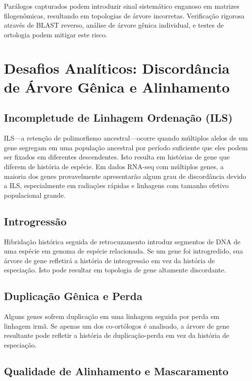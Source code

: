Parálogos capturados podem introduzir sinal sistemático enganoso em matrizes filogenômicas, resultando em topologias de árvore incorretas. Verificação rigorosa através de BLAST reverso, análise de árvore gênica individual, e testes de ortologia podem mitigar este risco.

\section{Desafios Analíticos: Discordância de Árvore Gênica e Alinhamento}

\subsection{Incompletude de Linhagem Ordenação (ILS)}

ILS---a retenção de polimorfismo ancestral---ocorre quando múltiplos alelos de um gene segregam em uma população ancestral por período suficiente que eles podem ser fixados em diferentes descendentes. Isto resulta em histórias de gene que diferem de história de espécie. Em dados RNA-seq com múltiplos genes, a maioria dos genes provavelmente apresentarão algum grau de discordância devido a ILS, especialmente em radiações rápidas e linhagens com tamanho efetivo populacional grande.

\subsection{Introgressão}

Hibridação histórica seguida de retrocuzamento introduz segmentos de DNA de uma espécie em genoma de espécie relacionada. Se um gene foi introgredido, sua árvore de gene refletirá a história de introgressão em vez da história de especiação. Isto pode resultar em topologia de gene altamente discordante.

\subsection{Duplicação Gênica e Perda}

Alguns genes sofrem duplicação em uma linhagem seguida por perda em linhagem irmã. Se apenas um dos co-ortólogos é analisado, a árvore de gene resultante pode refletir a história de duplicação-perda em vez da história de especiação.

\subsection{Qualidade de Alinhamento e Mascaramento}

